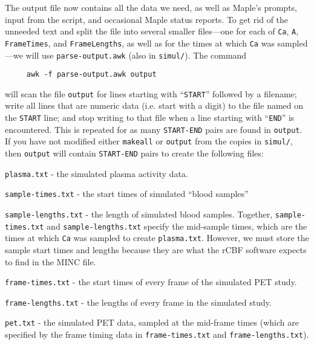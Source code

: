 \documentclass[11pt]{article}
\begin{document}
The output file now contains all the data we need, as well as Maple's
prompts, input from the script, and occasional Maple status reports.
To get rid of the unneeded text and split the file into several
smaller files---one for each of \verb|Ca|, \verb|A|, \verb|FrameTimes|,
and \verb|FrameLengths|, as well as for the times at which \verb|Ca|
was sampled---we will use \verb|parse-output.awk| (also in
\verb|simul/|).  The command
\begin{verbatim}
     awk -f parse-output.awk output
\end{verbatim}
will scan the file \verb|output| for lines starting with
``\verb|START|'' followed by a filename; write all lines that are
numeric data (i.e. start with a digit) to the file named on the
\verb|START| line; and stop writing to that file when a line starting
with ``\verb|END|'' is encountered.  This is repeated for as many
\verb|START-END| pairs are found in \verb|output|.  If you have not
modified either \verb|makeall| or \verb|output| from the copies in
\verb|simul/|, then \verb|output| will contain
\verb|START-END| pairs to create the following files:
\begin{description}
\item \verb|plasma.txt| - the simulated plasma activity data.
\item \verb|sample-times.txt| - the start times of simulated ``blood samples''
\item \verb|sample-lengths.txt| - the length of simulated blood samples.  
Together, \verb|sample-times.txt| and \verb|sample-lengths.txt|
specify the mid-sample times, which are the times at which \verb|Ca|
was sampled to create \verb|plasma.txt|.  However, we must store the
sample start times and lengths because they are what the rCBF software
expects to find in the MINC file.
\item \verb|frame-times.txt| - the start times of every frame of the
simulated PET study.
\item \verb|frame-lengths.txt| - the lengths of every frame in the
simulated study.
\item \verb|pet.txt| - the simulated PET data, sampled at the
mid-frame times (which are specified by the frame timing data in
\verb|frame-times.txt| and \verb|frame-lengths.txt|).
\end{description}
\end{document}
